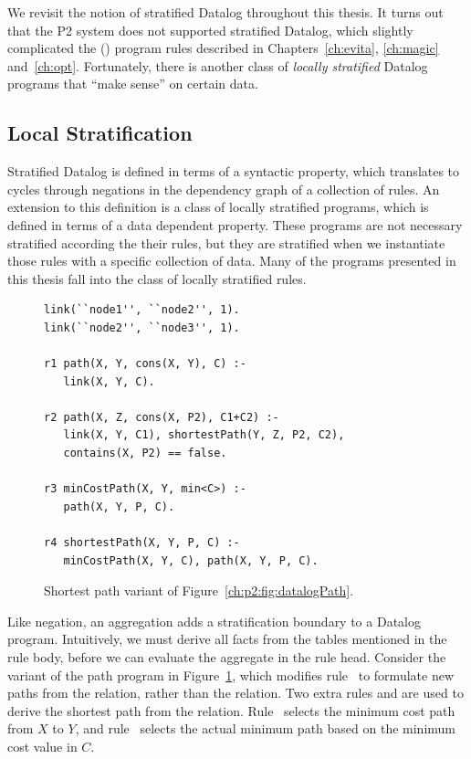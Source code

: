 We revisit the notion of stratified Datalog throughout this thesis.  It turns
out that the P2 system does not supported stratified Datalog, which slightly
complicated the (\OVERLOG) program rules described in Chapters~\ref{ch:evita},
\ref{ch:magic} and~\ref{ch:opt}.  Fortunately, there is another class of {\em
locally stratified} Datalog programs that ``make sense'' on certain data.

\subsection{Local Stratification}

Stratified Datalog is defined in terms of a syntactic property, which
translates to cycles through negations in the dependency graph of a collection
of rules.  An extension to this definition is a class of locally stratified
programs, which is defined in terms of a data dependent property.  These
programs are not necessary stratified according the their rules, but they are
stratified when we instantiate those rules with a specific collection of data.
Many of the programs presented in this thesis fall into the class of locally
stratified rules.

\begin{figure}
\ssp
\begin{lstlisting}
link(``node1'', ``node2'', 1).
link(``node2'', ``node3'', 1).

r1 path(X, Y, cons(X, Y), C) :-
   link(X, Y, C).

r2 path(X, Z, cons(X, P2), C1+C2) :-
   link(X, Y, C1), shortestPath(Y, Z, P2, C2),
   contains(X, P2) == false.

r3 minCostPath(X, Y, min<C>) :-
   path(X, Y, P, C).

r4 shortestPath(X, Y, P, C) :-
   minCostPath(X, Y, C), path(X, Y, P, C).

\end{lstlisting}
\caption{\label{ch:p2:fig:datalogSP}Shortest path variant of Figure~\ref{ch:p2:fig:datalogPath}.}
\end{figure}

Like negation, an aggregation adds a stratification boundary to a Datalog
program.  Intuitively, we must derive all facts from the tables mentioned in
the rule body, before we can evaluate the aggregate in the rule head.
Consider the variant of the path program in Figure~\ref{ch:p2:fig:datalogSP},
which modifies rule~ to formulate new paths from the 
relation, rather than the  relation.  Two extra rules  and
 are used to derive the shortest path from the  relation.
Rule~ selects the minimum cost path from $X$ to $Y$, and rule~
selects the actual minimum path based on the minimum cost value in $C$.

